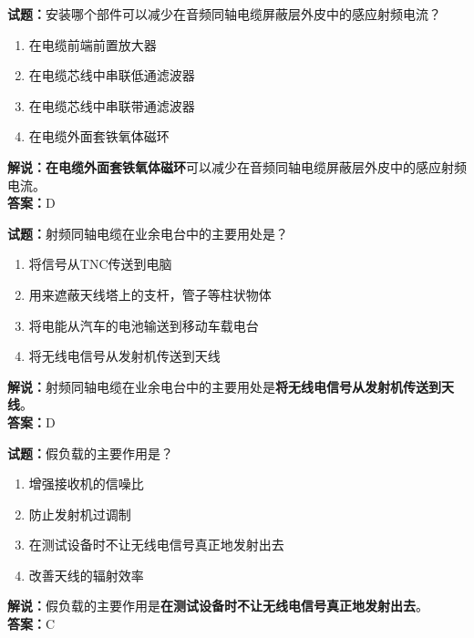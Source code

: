 \documentclass{ctexbook}
\begin{document}
\noindent\textbf{试题：}安装哪个部件可以减少在音频同轴电缆屏蔽层外皮中的感应射频电流？

\begin{enumerate}[leftmargin=3em]
  \item 在电缆前端前置放大器
  \item 在电缆芯线中串联低通滤波器
  \item 在电缆芯线中串联带通滤波器
  \item 在电缆外面套铁氧体磁环
\end{enumerate}

\noindent\textbf{解说：}\textbf{在电缆外面套铁氧体磁环}可以减少在音频同轴电缆屏蔽层外皮中的感应射频电流。\\\noindent\textbf{答案：}D

\vspace{\baselineskip}

\noindent\textbf{试题：}射频同轴电缆在业余电台中的主要用处是？

\begin{enumerate}[leftmargin=3em]
  \item 将信号从TNC传送到电脑
  \item 用来遮蔽天线塔上的支杆，管子等柱状物体
  \item 将电能从汽车的电池输送到移动车载电台
  \item 将无线电信号从发射机传送到天线
\end{enumerate}

\noindent\textbf{解说：}射频同轴电缆在业余电台中的主要用处是\textbf{将无线电信号从发射机传送到天线}。\\\noindent\textbf{答案：}D

\vspace{\baselineskip}

\noindent\textbf{试题：}假负载的主要作用是？

\begin{enumerate}[leftmargin=3em]
  \item 增强接收机的信噪比
  \item 防止发射机过调制
  \item 在测试设备时不让无线电信号真正地发射出去
  \item 改善天线的辐射效率
\end{enumerate}

\noindent\textbf{解说：}假负载的主要作用是\textbf{在测试设备时不让无线电信号真正地发射出去}。\\\noindent\textbf{答案：}C

\vspace{\baselineskip}
\end{document}
